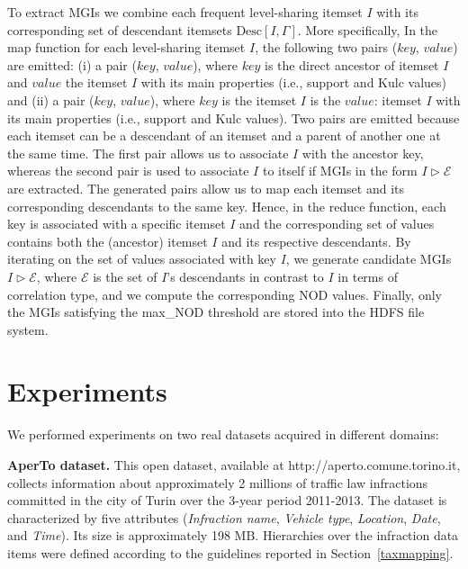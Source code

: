 To extract MGIs we combine each frequent level-sharing itemset $I$ with  
its corresponding set of descendant itemsets $\mbox{Desc}[I,\Gamma]$. 
More specifically, In the map function for each level-sharing itemset $I$, the following two pairs ($key$, $value$) are emitted:
(i) a pair ($key$, $value$), where $key$ is the direct ancestor of itemset $I$ and $value$ the itemset $I$ with its main properties (i.e., support and Kulc values) and
(ii) a pair ($key$, $value$), where $key$ is the itemset $I$ is the $value$: itemset $I$ with its main properties (i.e., support and Kulc values).
Two pairs are emitted because each itemset can be a descendant of an itemset and 
a parent of another one at the same time. The first pair allows us to associate $I$ with the ancestor key, whereas
the second pair is used to associate $I$ to itself if MGIs in the form $I \triangleright \mathcal{E}$ are extracted. 
The generated pairs allow us to map each itemset and its corresponding descendants to the same key. 
Hence, in the reduce function, each key is associated with a specific itemset $I$ and the corresponding set of values 
contains both the (ancestor) itemset $I$ and its respective descendants. By iterating on the set of values associated with key $I$, 
we generate candidate MGIs $I \triangleright \mathcal{E}$, where $\mathcal{E}$ is the set of $I$'s descendants in contrast to $I$ in terms of correlation type,
and we compute the corresponding NOD values. Finally, only the MGIs satisfying the max\_NOD threshold are stored into the HDFS file system.


\section{Experiments}
\label{exp}
We performed experiments on two real datasets acquired in different domains:

\noindent \textbf{AperTo dataset.}  This open dataset, available at http://aperto.comune.torino.it, collects information about approximately 2 millions of traffic law infractions committed in the city 
of Turin over the 3-year period 2011-2013. The dataset is characterized by five attributes (\textit{Infraction name}, \textit{Vehicle type}, \textit{Location}, \textit{Date}, and \textit{Time}). Its size is approximately 198 MB. 
Hierarchies over the infraction data items were defined according to the guidelines reported in Section~\ref{taxmapping}.

